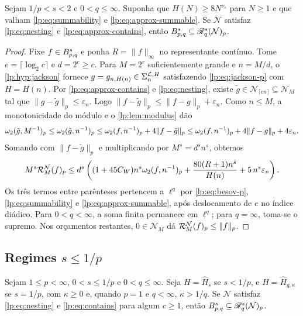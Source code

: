 \documentclass[12pt,a4paper]{article}
\begin{document}
\begin{proposicao}
\label{lp:thm:approx-transfer}
Sejam $1/p<s<2$ e $0<q\le\infty$. Suponha que $H(N)\ge8N^{\nu_s}$ para $N\ge1$ e que valham \eqref{lp:eq:summability} e \eqref{lp:eq:approx-summable}. Se $\mathcal N$ satisfaz \eqref{lp:eq:nesting} e \eqref{lp:eq:approx-contains}, então $B^{s}_{p,q}\subseteq\mathscr R^{s}_{q}(\mathcal N)_p$.
\end{proposicao}

\begin{proof}
Fixe $f\in B^{s}_{p,q}$ e ponha $R=\|f\|_\infty$ no representante contínuo. Tome $e=\lceil\log_2c\rceil$ e $d=2^e\ge c$. Para $M=2^r$ suficientemente grande e $n=M/d$, o \cref{lp:hyp:jackson} fornece $g=g_{n,H(n)}\in\Sigma_{n}^{\mathcal L,H}$ satisfazendo \eqref{lp:eq:jackson-p} com $H=H(n)$. Por \eqref{lp:eq:approx-contains} e \eqref{lp:eq:nesting}, existe $\tilde g\in\mathcal N_{\lceil cn\rceil}\subseteq\mathcal N_M$ tal que $\|g-\tilde g\|_p\le\varepsilon_n$. Logo $\|f-\tilde g\|_p\le\|f-g\|_p+\varepsilon_n$. Como $n\le M$, a monotonicidade do módulo e o \cref{lp:lem:modulus} dão
\[
 \omega_2(\tilde g,M^{-1})_{p}
 \le\omega_2(\tilde g,n^{-1})_{p}
 \le\omega_2(f,n^{-1})_{p}+4\|f-\tilde g\|_p
 \le\omega_2(f,n^{-1})_{p}+4\|f-g\|_p+4\varepsilon_n.
\]
Somando com $\|f-\tilde g\|_p$ e multiplicando por $M^s=d^s n^s$, obtemos
\[
 M^s\mathcal R^{\mathcal N}_{M}(f)_p
 \le d^s\left((1+45C_W)n^s\omega_2(f,n^{-1})_{p}+\frac{80(R+1)n^s}{H(n)}+5\,n^s\varepsilon_n\right).
\]
Os três termos entre parênteses pertencem a $\ell^q$ por \eqref{lp:eq:besov-p}, \eqref{lp:eq:summability} e \eqref{lp:eq:approx-summable}, após deslocamento de $e$ no índice diádico. Para $0<q<\infty$, a soma finita permanece em $\ell^q$; para $q=\infty$, toma-se o supremo. Nos orçamentos restantes, $0\in\mathcal N_M$ dá $\mathcal R^{\mathcal N}_{M}(f)_p\le\|f\|_p$.
\end{proof}

\subsection{Regimes \texorpdfstring{$s\le1/p$}{s ≤ 1/p}}

\begin{proposicao}
\label{lp:thm:low-transfer}
Sejam $1\le p<\infty$, $0<s\le1/p$ e $0<q\le\infty$. Seja $H=\widehat H_s$ se $s<1/p$, e $H=\widehat H_{q,\kappa}$ se $s=1/p$, com $\kappa\ge0$ e, quando $p=1$ e $q<\infty$, $\kappa>1/q$. Se $\mathcal N$ satisfaz \eqref{lp:eq:nesting} e \eqref{lp:eq:contains} para algum $c\ge1$, então $B^{s}_{p,q}\subseteq\mathscr R^{s}_{q}(\mathcal N)_p$.
\end{proposicao}
\end{document}
